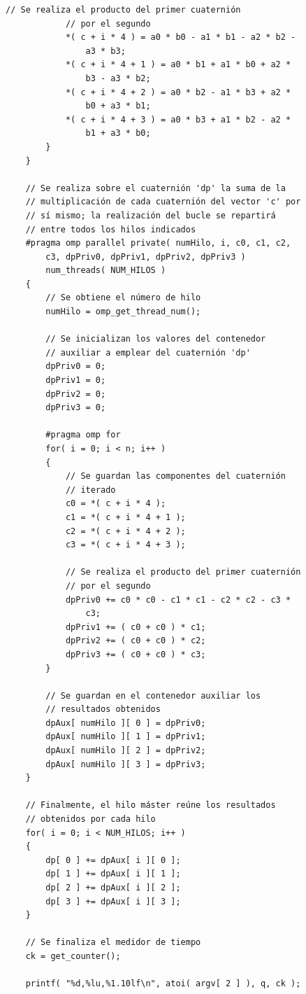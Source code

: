 \documentclass[conference]{IEEEtran}
\begin{document}
\begin{lstlisting}[style=CStyle, title=Código multihilo.]
            // Se realiza el producto del primer cuaternión
            // por el segundo
            *( c + i * 4 ) = a0 * b0 - a1 * b1 - a2 * b2 -
                a3 * b3;
            *( c + i * 4 + 1 ) = a0 * b1 + a1 * b0 + a2 *
                b3 - a3 * b2;
            *( c + i * 4 + 2 ) = a0 * b2 - a1 * b3 + a2 *
                b0 + a3 * b1;
            *( c + i * 4 + 3 ) = a0 * b3 + a1 * b2 - a2 *
                b1 + a3 * b0;
        }
    }

    // Se realiza sobre el cuaternión 'dp' la suma de la
    // multiplicación de cada cuaternión del vector 'c' por
    // sí mismo; la realización del bucle se repartirá
    // entre todos los hilos indicados
    #pragma omp parallel private( numHilo, i, c0, c1, c2,
        c3, dpPriv0, dpPriv1, dpPriv2, dpPriv3 )
        num_threads( NUM_HILOS )
    {
        // Se obtiene el número de hilo
        numHilo = omp_get_thread_num();

        // Se inicializan los valores del contenedor
        // auxiliar a emplear del cuaternión 'dp'
        dpPriv0 = 0;
        dpPriv1 = 0;
        dpPriv2 = 0;
        dpPriv3 = 0;

        #pragma omp for
        for( i = 0; i < n; i++ )
        {
            // Se guardan las componentes del cuaternión
            // iterado
            c0 = *( c + i * 4 );
            c1 = *( c + i * 4 + 1 );
            c2 = *( c + i * 4 + 2 );
            c3 = *( c + i * 4 + 3 );

            // Se realiza el producto del primer cuaternión
            // por el segundo
            dpPriv0 += c0 * c0 - c1 * c1 - c2 * c2 - c3 *
                c3;
            dpPriv1 += ( c0 + c0 ) * c1;
            dpPriv2 += ( c0 + c0 ) * c2;
            dpPriv3 += ( c0 + c0 ) * c3;
        }

        // Se guardan en el contenedor auxiliar los
        // resultados obtenidos
        dpAux[ numHilo ][ 0 ] = dpPriv0;
        dpAux[ numHilo ][ 1 ] = dpPriv1;
        dpAux[ numHilo ][ 2 ] = dpPriv2;
        dpAux[ numHilo ][ 3 ] = dpPriv3;
    }

    // Finalmente, el hilo máster reúne los resultados
    // obtenidos por cada hilo
    for( i = 0; i < NUM_HILOS; i++ )
    {
        dp[ 0 ] += dpAux[ i ][ 0 ];
        dp[ 1 ] += dpAux[ i ][ 1 ];
        dp[ 2 ] += dpAux[ i ][ 2 ];
        dp[ 3 ] += dpAux[ i ][ 3 ];
    }

    // Se finaliza el medidor de tiempo
    ck = get_counter();

    printf( "%d,%lu,%1.10lf\n", atoi( argv[ 2 ] ), q, ck );
    

\end{lstlisting}
\end{document}
